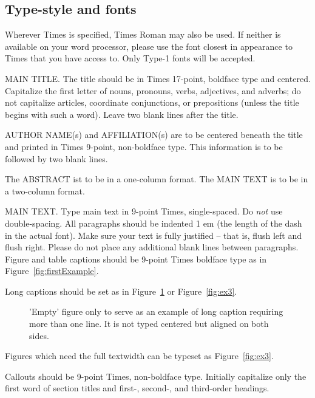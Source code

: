 \documentclass{egpubl}
\begin{document}
\subsection{Type-style and fonts}

Wherever Times is specified, Times Roman may also be used. If
neither is available on your word processor, please use the font
closest in appearance to Times that you have access to. Only
Type-1 fonts will be accepted.

MAIN TITLE. The title should be in Times 17-point, boldface type and
centered. Capitalize the first letter of nouns, pronouns, verbs, adjectives,
and adverbs; do not capitalize articles, coordinate conjunctions, or
prepositions (unless the title begins with such a word). Leave two blank
lines after the title.

AUTHOR NAME(s) and AFFILIATION(s) are to be centered beneath the title and
printed in Times 9-point, non-boldface type. This information is to be
followed by two blank lines.

The ABSTRACT ist to be in a one-column format. The MAIN TEXT is to be in a
two-column format.

MAIN TEXT. Type main text in 9-point Times, single-spaced. Do \emph{not} use
double-spacing. All paragraphs should be indented 1 em (the length of the
dash in the actual font). Make sure your text is fully justified -- that is,
flush left and flush right. Please do not place any additional blank lines
between paragraphs. Figure and table captions should be 9-point Times
boldface type as in Figure~\ref{fig:firstExample}.

\noindent Long captions should be set as in Figure~\ref{fig:ex1} or
Figure~\ref{fig:ex3}.

\begin{figure}[htb]
   \caption{\label{fig:ex1}
     'Empty' figure only to serve as an example of long caption requiring
     more than one line. It is not typed centered but aligned on both sides.}
\end{figure}

\noindent
Figures which need the full textwidth can be typeset as Figure~\ref{fig:ex3}.

\noindent Callouts should be 9-point Times, non-boldface type. Initially
capitalize only the first word of section titles and first-, second-, and
third-order headings.
\end{document}
